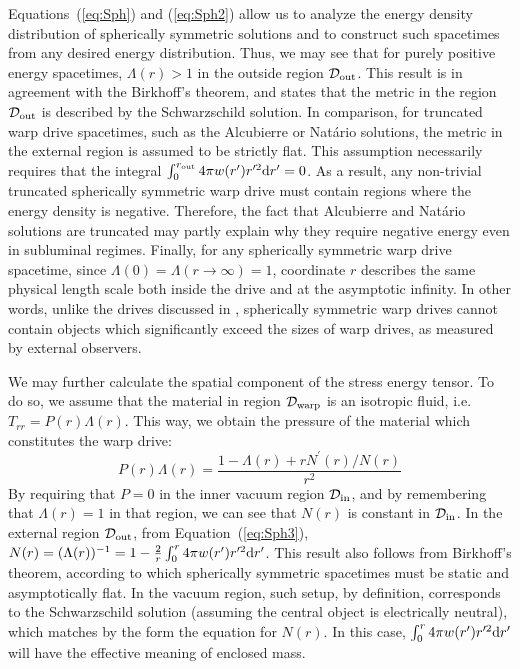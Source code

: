 \documentclass[10pt]{iopart}
\begin{document}
Equations~(\ref{eq:Sph}) and (\ref{eq:Sph2}) allow us to analyze the energy density distribution of spherically symmetric solutions and to construct such spacetimes from any desired energy distribution. Thus, we may see that for purely positive energy spacetimes, $\Lambda(r)>1$ in the outside region $\mathcal{D}_{\rm out}$. This result is in agreement with the Birkhoff's theorem, and states that the metric in the region $\mathcal{D}_{\rm out}$ is described by the Schwarzschild solution. In comparison, for truncated warp drive spacetimes, such as the Alcubierre or Natário solutions, the metric in the external region is assumed to be strictly flat. This assumption necessarily requires that the integral $\int_0^{r_{\rm out}} 4\pi w(r^\prime) r^{\prime 2}{\rm d}r^{\prime}=0$. As a result, any non-trivial truncated spherically symmetric warp drive must contain regions where the energy density is negative. Therefore, the fact that Alcubierre and Natário solutions are truncated may partly explain why they require negative energy even in subluminal regimes. Finally, for any spherically symmetric warp drive spacetime, since $\Lambda(0)=\Lambda(r\rightarrow\infty)=1$, coordinate $r$ describes the same physical length scale both inside the drive and at the asymptotic infinity. In other words, unlike the drives discussed in \cite{vandenBroeck1999}, spherically symmetric warp drives cannot contain objects which significantly exceed the sizes of warp drives, as measured by external observers.

We may further calculate the spatial component of the stress energy tensor. To do so, we assume that the material in region $\mathcal{D}_{\rm warp}$ is an isotropic fluid, i.e. $T_{rr}=P(r) \Lambda(r)$. This way, we obtain the pressure of the material which constitutes the warp drive:
\begin{equation}
    P(r)\Lambda(r) = \frac{1-\Lambda(r)+r N^\prime(r)/N(r)}{r^2}
    \label{eq:Sph3}
\end{equation}
By requiring that $P=0$ in the inner vacuum region $\mathcal{D}_{\rm in}$, and by remembering that $\Lambda(r)=1$ in that region, we can see that $N(r)$ is constant in $\mathcal{D}_{\rm in}$. In the external region $\mathcal{D}_{\rm out}$, from Equation~(\ref{eq:Sph3}), $N(r) = (\Lambda(r))^{-1} = 1-\frac{2}{r}\int_0^r 4\pi w(r^\prime) r^{\prime 2}{\rm d}r^{\prime}$.  This result also follows from Birkhoff's theorem, according to which spherically symmetric spacetimes must be static and asymptotically flat. In the vacuum region, such setup, by definition, corresponds to the Schwarzschild solution (assuming the central object is electrically neutral), which matches by the form the equation for $N(r)$. In this case, $\int_0^r 4\pi w(r^\prime) r^{\prime 2}{\rm d}r^{\prime}$ will have the effective meaning of enclosed mass.
\end{document}
